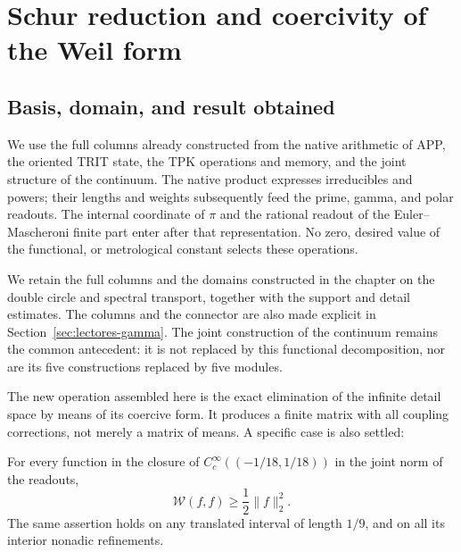 \clearpage
\section{Schur reduction and coercivity of the Weil form}
\label{sec:schur-coercividad}


\subsection{Basis, domain, and result obtained}
\label{schur-add-sub-6}

We use the full columns already constructed from the native arithmetic
of APP, the oriented TRIT state, the TPK operations and memory, and the
joint structure of the continuum. The native product expresses irreducibles and
powers; their lengths and weights subsequently feed the prime,
gamma, and polar readouts. The internal coordinate of \(\pi\) and the rational readout of the
Euler--Mascheroni finite part enter after that representation. No
zero, desired value of the functional, or metrological constant selects these
operations.

We retain the full columns and the domains constructed in the
chapter on the double circle and spectral transport, together with the
support and detail estimates. The columns and the connector are also made explicit in
Section~\ref{sec:lectores-gamma}. The joint construction
of the continuum remains the common antecedent: it is not replaced by this
functional decomposition, nor are its five constructions replaced by five modules.

The new operation assembled here is the exact elimination of the
infinite detail space by means of its coercive form. It produces a finite matrix
with all coupling corrections, not merely a matrix of
means. A specific case is also settled:

For every function in the closure of
\(C_c^\infty((-1/18,1/18))\) in the joint norm of the readouts,
\begin{equation}
\mathscr W(f,f)\geq\frac12\|f\|_2^2.
\label{schur-add-display-1}
\end{equation}
The same assertion holds on any translated interval of length
\(1/9\), and on all its interior nonadic refinements.

